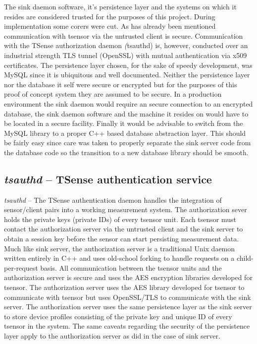 The sink daemon software, it's persistence layer and the systems on which it resides are considered trusted for the purposes of this project. During implementation some corers were cut. As has already been mentioned communication with tsensor via the untrusted client is secure. Communication with the TSense authorization daemon \emph(tsauthd) is, however, conducted over an industrial strength TLS tunnel (OpenSSL) with mutual authentication via x509 certificates. The persistence layer chosen, for the sake of speedy development, was MySQL since it is ubiquitous and well documented. Neither the persistence layer nor the database it self were secure or encrypted but for the purposes of this proof of concept system they are assumed to be secure. In a production environment the sink daemon would require an secure connection to an encrypted database, the sink daemon software and the machine it resides on would have to be located in a secure facility. Finally it would be advisable to switch from the MySQL library to a proper C++ based database abstraction layer. This should be fairly easy since care was taken to properly separate the sink server code from the database code so the transition to a new database library should be smooth.

\subsection{\textit{tsauthd} -- TSense authentication service}
\label{sec:tsauthd-description}

\textit{tsauthd} -- The TSense authentication daemon handles the integration of sensor/client pairs into a working measurement system. The authorization sever holds the private keys (private IDs) of every tsensor unit. Each tsensor must contact the authorization server via the untrusted client and the sink server to obtain a session key before the sensor can start persisting measurement data.  Much like sink server, the authorization server is a traditional Unix daemon written  entirely in C++ and uses old-school forking to handle requests on a child-per-request basis. All communication between the tsensor units and the authorization server is secure and uses the AES encryption libraries developed for tsensor.  The authorization server uses the AES library developed for tsensor to communicate with tsensor but uses OpenSSL/TLS to communicate with the sink server. The authorization server uses the same persistence layer as the sink server to store device profiles consisting of the private key and unique ID of every tsensor in the system. The same caveats regarding the security of the persistence layer apply to the authorization server as did in the case of sink server.\\ 


